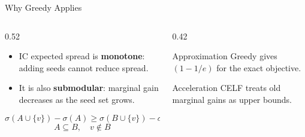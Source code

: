 \documentclass[10pt, aspectratio=169]{beamer}
\newcommand{\metricbox}[2]{%
    \begin{block}{#1}
        \centering\Large #2
    \end{block}
}
\begin{document}
\begin{frame}{Why Greedy Applies}
    \begin{columns}[T,onlytextwidth]
        \begin{column}{0.52\linewidth}
            \begin{itemize}
                \item IC expected spread is \textbf{monotone}: adding seeds cannot reduce spread.
                \item It is also \textbf{submodular}: marginal gain decreases as the seed set grows.
            \end{itemize}
            \[
                \sigma(A\cup\{v\})-\sigma(A)
                \geq
                \sigma(B\cup\{v\})-\sigma(B)
            \]
            \[
                A\subseteq B,\quad v\notin B
            \]
        \end{column}
        \begin{column}{0.42\linewidth}
            \metricbox{Approximation}{Greedy gives $(1-1/e)$ for the exact objective.}
            \metricbox{Acceleration}{CELF treats old marginal gains as upper bounds.}
        \end{column}
    \end{columns}
\end{frame}
\end{document}
